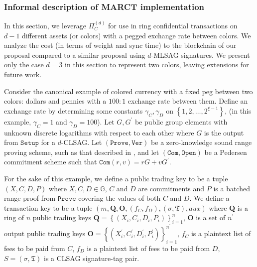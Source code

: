 \documentclass{article}
\theoremstyle{plain}
\theoremstyle{definition}
\begin{document}
\subsubsection{Informal description of MARCT implementation}\label{ex:dualasset}

In this section, we leverage $\Pi_C^{(d)}$ for use in ring confidential transactions on $d-1$ different assets (or colors) with a pegged exchange rate between colors. We analyze the cost (in terms of weight and sync time) to the blockchain of our proposal compared to a similar proposal using $d$-MLSAG signatures. We present only the case $d=3$ in this section to represent two colors, leaving extensions for future work.

Consider the canonical example of colored currency with a fixed peg between two colors: dollars and pennies with a $100:1$ exchange rate between them. Define an exchange rate by determining some constants $\gamma_C, \gamma_D$ on $\left\{1, 2, \ldots, 2^{\xi - 1}\right\}$, (in this example, $\gamma_C = 1$ and $\gamma_D = 100$). Let $G, G^\prime$ be public group elements with unknown discrete logarithms with respect to each other where $G$ is the output from $\texttt{Setup}$ for a $d$-CLSAG.  Let $(\texttt{Prove}, \texttt{Ver})$ be a zero-knowledge sound range proving scheme, such as that described in \cite{bulletproofs}, and let $(\texttt{Com}, \texttt{Open})$ be a Pedersen commitment scheme such that $\texttt{Com}(r,v) = rG + v G^\prime$.

For the sake of this example, we define a public trading key to be a tuple $(X, C, D, P)$ where $X, C, D \in \mathbb{G}$, $C$ and $D$ are commitments and $P$ is a batched range proof from $\texttt{Prove}$ covering the values of both $C$ and $D$. We define a transaction key to be a tuple $(m, \textbf{Q}, \textbf{O}, (f_C, f_D), (\sigma, \mathfrak{T}), \textit{aux})$ where $\textbf{Q}$ is a ring of $n$ public trading keys  $\textbf{Q} = \left\{(X_i, C_i, D_i, P_i)\right\}_{i=1}^{n}$, $\textbf{O}$ is a set of $n^\prime$ output public trading keys $\textbf{O} = \left\{(X_i^\prime, C_i^\prime, D_i^\prime, P_i^\prime)\right\}_{i=1}^{n^\prime}$, $f_C$ is a plaintext list of fees to be paid from $C$, $f_D$ is a plaintext list of fees to be paid from $D$, $S=(\sigma, \mathfrak{T})$ is a CLSAG signature-tag pair.
\end{document}
